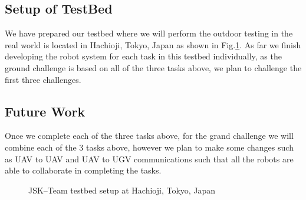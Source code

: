 \documentclass{standalone}
\begin{document}
\subsection{Setup of TestBed}

We have prepared our testbed where we will perform the outdoor testing in the real world is located in Hachioji, Tokyo, Japan as shown in Fig.\ref{fig:objects}. As far we finish developing the robot system for each task in this testbed individually, as the ground challenge is based on all of the three tasks above, we plan to challenge the first three challenges.

\subsection{Future Work}
Once we complete each of the three tasks above, for the grand challenge we will combine each of the 3 tasks above, however we plan to make some changes such as UAV to UAV and UAV to UGV communications such that all the robots are able to collaborate in completing the tasks.
 
\begin{figure}[h]
   \newcommand \ilenght{0.1}
   \newcommand \iheight{2.0in}
   \newcommand \iwidth{0.46\textwidth}
   \centering
   \hspace{1.1em}%
   \hspace{1.1em}%
   \hspace{1.1em}%
   \hspace{1.1em}%
   \caption{JSK--Team testbed setup at Hachioji, Tokyo, Japan}
   \label{fig:objects}
 \end{figure}
\end{document}
